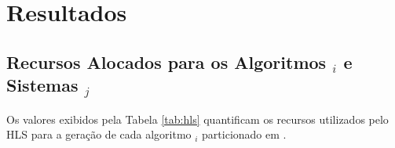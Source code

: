         
\chapter{Resultados}   \label{chap:results}
    
    \section{Recursos Alocados para os Algoritmos \A$_{i}$ e Sistemas \Ss$_{j}$}
        
        Os valores exibidos pela Tabela \ref{tab:hls} quantificam os recursos utilizados pelo HLS para a geração de cada algoritmo \A$_{i}$ particionado em \hardware.
        
